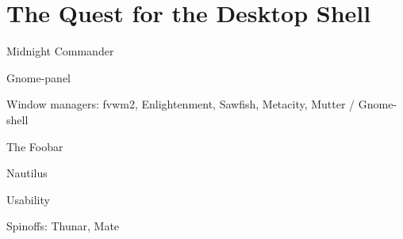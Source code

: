 \chapter{The Quest for the Desktop Shell}

Midnight Commander

Gnome-panel

Window managers:  fvwm2, Enlightenment, Sawfish, Metacity, Mutter / Gnome-shell

The Foobar

Nautilus

Usability

Spinoffs: Thunar, Mate

